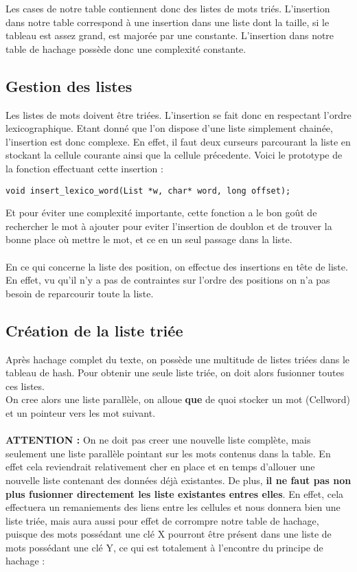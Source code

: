 \documentclass[french, 12pt, titlepage]{article}
\begin{document}
Les cases de notre table contiennent donc des listes de mots
triés. L'insertion dans notre table correspond à une insertion dans
une liste dont la taille, si le tableau est assez grand, est majorée par une
constante. L'insertion dans notre table de hachage possède donc une
complexité constante.

\subsection{Gestion des listes}
Les listes de mots doivent être triées. L'insertion se fait donc en
respectant l'ordre lexicographique. Etant donné que l'on dispose d'une
liste simplement chainée, l'insertion est donc complexe. En effet, il
faut deux curseurs parcourant la liste en stockant la cellule courante
ainsi que la cellule précedente. Voici le prototype de la fonction
effectuant cette insertion :

\begin{lstlisting}
void insert_lexico_word(List *w, char* word, long offset);
\end{lstlisting}

Et pour éviter une complexité importante, cette fonction a le bon goût
de rechercher le mot à ajouter pour eviter l'insertion de doublon et
de trouver la bonne place où mettre le mot, et ce en un seul passage
dans la liste.\\\\

En ce qui concerne la liste des position, on effectue des insertions
en tête de liste. En effet, vu qu'il n'y a pas de contraintes sur
l'ordre des positions on n'a pas besoin de reparcourir toute la liste.

\subsection{Création de la liste triée}
Après hachage complet du texte, on possède une multitude de listes
triées dans le tableau de hash. Pour obtenir une seule liste triée, on
doit alors fusionner toutes ces listes.\\

On cree alors une liste parallèle, on alloue \textbf{que} de quoi stocker
un mot (Cellword) et un pointeur vers les mot suivant.\\\\

\textbf{ATTENTION :} On ne doit pas creer une nouvelle liste complète,
mais seulement une liste parallèle pointant sur les mots contenus dans
la table. En effet cela reviendrait relativement cher en place et en
temps d'allouer une nouvelle liste contenant des données déjà
existantes. De plus, \textbf{il ne faut pas non plus fusionner directement les
liste existantes entres elles}. En effet, cela effectuera un
remaniements des liens entre les cellules et nous donnera bien une
liste triée, mais aura aussi pour effet de corrompre notre table de
hachage, puisque des mots possédant une clé X pourront être présent
dans une liste de mots possédant une clé Y, ce qui est totalement à
l'encontre du principe de hachage :
\end{document}
